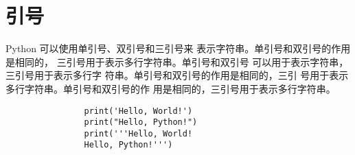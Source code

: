 \documentclass[a4paper,12pt]{article}
\begin{document}
    \section{引号}
        Python 可以使用单引号、双引号和三引号来
        表示字符串。单引号和双引号的作用是相同的，
        三引号用于表示多行字符串。单引号和双引号
        可以用于表示字符串，三引号用于表示多行字
        符串。单引号和双引号的作用是相同的，三引
        号用于表示多行字符串。单引号和双引号的作
        用是相同的，三引号用于表示多行字符串。
        \begin{listing}[h]
            \begin{verbatim}
                print('Hello, World!')
                print("Hello, Python!")
                print('''Hello, World!
                Hello, Python!''')
            \end{verbatim}
        \end{listing}
    
\end{document}
